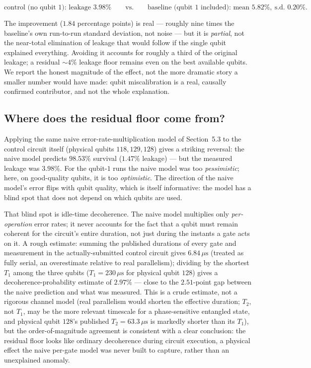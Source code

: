 \documentclass[11pt]{article}
\begin{document}
\[
  \text{control (no qubit }1\text{): leakage } 3.98\% \qquad\text{vs.}\qquad
  \text{baseline (qubit }1\text{ included): mean } 5.82\%,\ \text{s.d. } 0.20\%.
\]

The improvement ($1.84$ percentage points) is real --- roughly nine
times the baseline's own run-to-run standard deviation, not noise --- but
it is \emph{partial}, not the near-total elimination of leakage that
would follow if the single qubit explained everything. Avoiding it
accounts for roughly a third of the original leakage; a residual
$\sim\!4\%$ leakage floor remains even on the best available qubits. We
report the honest magnitude of the effect, not the more dramatic story a
smaller number would have made: qubit miscalibration is a real, causally
confirmed contributor, and not the whole explanation.

\subsection{Where does the residual floor come from?}

Applying the same naive error-rate-multiplication model of
Section~5.3 to the control circuit itself (physical qubits $118,129,128$)
gives a striking reversal: the naive model predicts $98.53\%$ survival
($1.47\%$ leakage) --- but the measured leakage was $3.98\%$. For the
qubit-$1$ runs the naive model was too \emph{pessimistic}; here, on
good-quality qubits, it is too \emph{optimistic}. The direction of the
naive model's error flips with qubit quality, which is itself informative:
the model has a blind spot that does not depend on which qubits are used.

That blind spot is idle-time decoherence. The naive model multiplies only
\emph{per-operation} error rates; it never accounts for the fact that a
qubit must remain coherent for the circuit's entire duration, not just
during the instants a gate acts on it. A rough estimate: summing the
published durations of every gate and measurement in the actually-submitted
control circuit gives $6.84\,\mu\text{s}$ (treated as fully serial, an
overestimate relative to real parallelism); dividing by the shortest
$T_1$ among the three qubits ($T_1 = 230\,\mu\text{s}$ for physical qubit
$128$) gives a decoherence-probability estimate of $2.97\%$ --- close to
the $2.51$-point gap between the naive prediction and what was measured.
This is a crude estimate, not a rigorous channel model (real parallelism
would shorten the effective duration; $T_2$, not $T_1$, may be the more
relevant timescale for a phase-sensitive entangled state, and physical
qubit $128$'s published $T_2 = 63.3\,\mu\text{s}$ is markedly shorter
than its $T_1$), but the order-of-magnitude agreement is consistent with
a clear conclusion: the residual floor looks like ordinary decoherence
during circuit execution, a physical effect the naive per-gate model was
never built to capture, rather than an unexplained anomaly.
\end{document}
